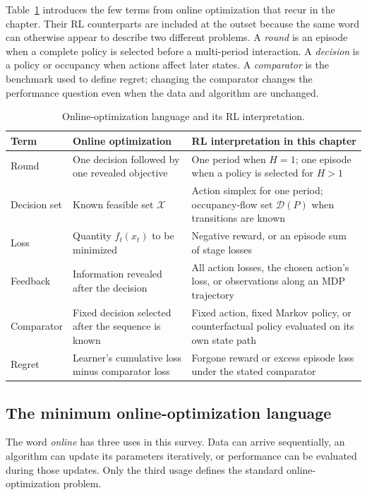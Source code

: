 Table~\ref{tab:online_terms} introduces the few terms from online optimization that recur in the chapter. Their RL counterparts are included at the outset because the same word can otherwise appear to describe two different problems. A \emph{round} is an episode when a complete policy is selected before a multi-period interaction. A \emph{decision} is a policy or occupancy when actions affect later states. A \emph{comparator} is the benchmark used to define regret; changing the comparator changes the performance question even when the data and algorithm are unchanged.

\begin{table}[htbp]
\centering
\caption{Online-optimization language and its RL interpretation.}
\label{tab:online_terms}
\begin{tabular}{p{}p{}p{}}
\toprule
Term & Online optimization & RL interpretation in this chapter \\
\midrule
Round & One decision followed by one revealed objective & One period when $H=1$; one episode when a policy is selected for $H>1$ \\
Decision set & Known feasible set $\mathcal X$ & Action simplex for one period; occupancy-flow set $\mathcal D(P)$ when transitions are known \\
Loss & Quantity $f_t(x_t)$ to be minimized & Negative reward, or an episode sum of stage losses \\
Feedback & Information revealed after the decision & All action losses, the chosen action's loss, or observations along an MDP trajectory \\
Comparator & Fixed decision selected after the sequence is known & Fixed action, fixed Markov policy, or counterfactual policy evaluated on its own state path \\
Regret & Learner's cumulative loss minus comparator loss & Forgone reward or excess episode loss under the stated comparator \\
\bottomrule
\end{tabular}
\end{table}

\subsection{The minimum online-optimization language}
\label{sec:online_minimum_language}

The word \emph{online} has three uses in this survey. Data can arrive sequentially, an algorithm can update its parameters iteratively, or performance can be evaluated during those updates. Only the third usage defines the standard online-optimization problem.

